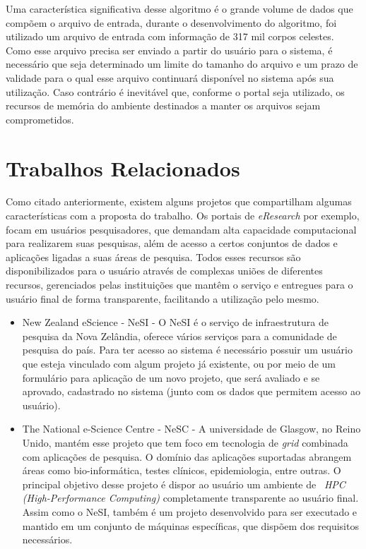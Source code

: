 \documentclass[tg]{mdtufsm}
\begin{document}
Uma característica significativa desse algoritmo é o grande volume de dados que compõem o arquivo de entrada, durante o desenvolvimento do algoritmo, foi utilizado um arquivo de entrada com informação de 317 mil corpos celestes. Como esse arquivo precisa ser enviado a partir do usuário para o sistema, é necessário que seja determinado um limite do tamanho do arquivo e um prazo de validade para o qual esse arquivo continuará disponível no sistema após sua utilização. Caso contrário é inevitável que, conforme o portal seja utilizado, os recursos de memória do ambiente destinados a manter os arquivos sejam comprometidos.

\section{Trabalhos Relacionados}
Como citado anteriormente, existem alguns projetos que compartilham algumas características com a proposta do trabalho.
Os portais de \emph{eResearch} por exemplo, focam em usuários pesquisadores, que demandam alta capacidade computacional para realizarem suas pesquisas, além de acesso a certos conjuntos de dados e aplicações ligadas a suas áreas de pesquisa. Todos esses recursos são disponibilizados para o usuário através de complexas uniões de diferentes recursos, gerenciados pelas instituições que mantêm o serviço e entregues para o usuário final de forma transparente, facilitando a utilização pelo mesmo.

\begin{itemize}
	\item New Zealand eScience - NeSI \cite{nesi} - O NeSI é o serviço de infraestrutura de pesquisa da Nova Zelândia, oferece vários serviços para a comunidade de pesquisa do país. Para ter acesso ao sistema é necessário possuir um usuário que esteja vinculado com algum projeto já existente, ou por meio de um formulário para aplicação de um novo projeto, que será avaliado e se aprovado, cadastrado no sistema (junto com os dados que permitem acesso ao usuário).
	\item The National e-Science Centre - NeSC \cite{nesc} - A universidade de Glasgow, no Reino Unido, mantém esse projeto que tem foco em tecnologia de \emph{grid} combinada com aplicações de pesquisa. O domínio das aplicações suportadas abrangem áreas como bio-informática, testes clínicos, epidemiologia, entre outras. O principal objetivo desse projeto é dispor ao usuário um ambiente de ~\emph{HPC (High-Performance Computing)} completamente transparente ao usuário final. Assim como o NeSI, também é um projeto desenvolvido para ser executado e mantido em um conjunto de máquinas específicas, que dispõem dos requisitos necessários.
\end{itemize}
\iffalse
\end{document}
